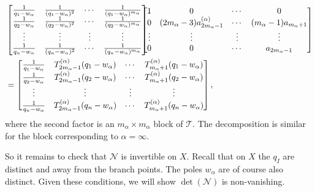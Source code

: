 \documentclass[a4paper,12pt,reqno]{amsart}
\numberwithin{equation}{section}
\numberwithin{counter2}{section}
\begin{document}
\begin{align}
&\begin{bmatrix}
\frac{1}{q_1-w_\alpha} & \frac{1}{(q_1-w_\alpha)^2} & \cdots & \frac{1}{(q_1-w_\alpha)^{m_\alpha}}  \\
\frac{1}{q_2-w_\alpha} & \frac{1}{(q_2-w_\alpha)^2} & \cdots & \frac{1}{(q_2-w_\alpha)^{m_\alpha}}  \\ 
\vdots & \vdots & \vdots & \vdots \\
\frac{1}{q_n-w_\alpha} & \frac{1}{(q_n-w_\alpha)^2} & \cdots & \frac{1}{(q_n-w_\alpha)^{m_\alpha}}  
\end{bmatrix}
\hspace{-3mm}
\begin{bmatrix}
  1 & 0 & \cdots & 0 \\ 
0 & {(2m_\alpha-3)a_{2m_\alpha-1}^{(\alpha)}} & \cdots  & (m_\alpha-1)a_{m_\alpha+1}  \\ 
\vdots & \vdots & \vdots & \vdots \\ 
0 & 0 & \cdots & {a_{2m_\alpha-1}}
\end{bmatrix}  \nonumber \\
&= 
\begin{bmatrix}
\frac{1}{q_1-w_\alpha} & T^{(\alpha)}_{2m_\alpha-1}(q_1-w_\alpha) & \cdots & T^{(\alpha)}_{m_\alpha+1}(q_1-w_\alpha)\\
\frac{1}{q_2-w_\alpha} & T^{(\alpha)}_{2m_\alpha-1}(q_2-w_\alpha) & \cdots & T^{(\alpha)}_{m_\alpha+1}(q_2-w_\alpha) \\
\vdots & \vdots & \vdots & \vdots \\
\frac{1}{q_n-w_\alpha} & T^{(\alpha)}_{2m_\alpha-1}(q_n-w_\alpha) & \cdots & T^{(\alpha)}_{m_\alpha+1}(q_n-w_\alpha)\\
\end{bmatrix},  
\end{align}
where the second factor is an $m_\alpha \times m_\alpha$ block of $\mathcal{T}$.  The decomposition is similar for the block corresponding to $\alpha = \infty$.   \par 
So it remains to check that $\mathcal{N}$ is invertible on $X$.  Recall that on $X$ the $q_I$ are distinct and away from the branch points.  The poles $w_\alpha$ are of course also distinct.  Given these conditions,  we will show $\det(\mathcal{N})$ is non-vanishing.  \par 
\end{document}
